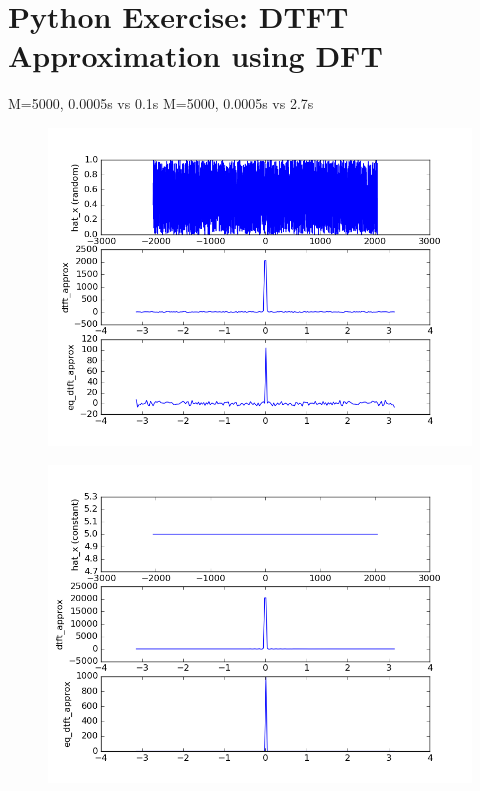 \section{Python Exercise: DTFT Approximation using DFT}\label{sec:p6}


M=5000, 0.0005s vs 0.1s
M=5000, 0.0005s vs 2.7s


\begin{figure}[htbp]
	\centering
	\includegraphics[width=\textwidth]{images/p6-1-200}
	\caption{}
	\label{fig:p6-1-200}
\end{figure}

\begin{figure}[htbp]
	\centering
	\includegraphics[width=\textwidth]{images/p6-2-200}
	\caption{}
	\label{fig:p6-2-200}
\end{figure}